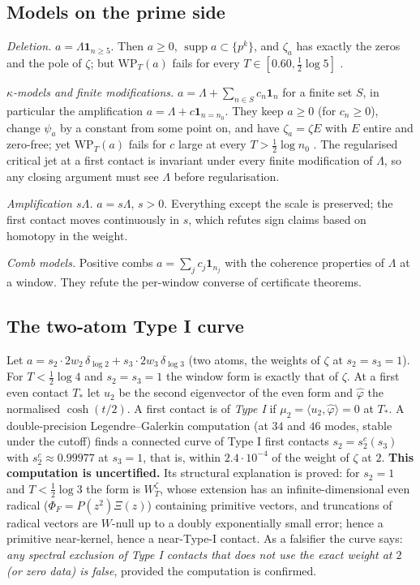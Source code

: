\documentclass[11pt]{amsart}
\theoremstyle{definition}
\theoremstyle{remark}
\newcommand{\supp}{\operatorname{supp}}
\begin{document}
\subsection{Models on the prime side}\label{subsec:primeside}
\emph{Deletion.} $a=\Lambda\mathbf 1_{n\ge5}$. Then $a\ge0$, $\supp a\subset\{p^k\}$, and $\zeta_a$ has exactly the
zeros and the pole of $\zeta$; but $\mathrm{WP}_T(a)$ fails for every $T\in[0.60,\frac12\log5]$
\cite[Thm.~12.5(i)]{Paper47}.

\emph{$\kappa$-models and finite modifications.} $a=\Lambda+\sum_{n\in S}c_n\mathbf 1_{n}$ for a finite set $S$,
in particular the amplification $a=\Lambda+c\mathbf1_{n=n_0}$. They keep $a\ge0$ (for $c_n\ge0$), change
$\psi_a$ by a constant from some point on, and have $\zeta_a=\zeta E$ with $E$ entire and zero-free; yet
$\mathrm{WP}_T(a)$ fails for $c$ large at every $T>\frac12\log n_0$
\cite[Thm.~12.5(ii)]{Paper47}. The regularised critical jet at a first contact is invariant
under every finite modification of $\Lambda$, so any closing argument must see $\Lambda$ before
regularisation.

\emph{Amplification $s\Lambda$.} $a=s\Lambda$, $s>0$. Everything except the scale is preserved; the first
contact moves continuously in $s$, which refutes sign claims based on homotopy in the weight.

\emph{Comb models.} Positive combs $a=\sum_jc_j\mathbf1_{n_j}$ with the coherence properties of $\Lambda$
at a window. They refute the per-window converse of certificate theorems.

\subsection{The two-atom Type I curve}\label{subsec:typeI}
Let $a=s_2\cdot2w_2\,\delta_{\log2}+s_3\cdot2w_3\,\delta_{\log3}$ (two atoms, the weights of $\zeta$ at
$s_2=s_3=1$). For $T<\frac12\log4$ and $s_2=s_3=1$ the window form is exactly that of $\zeta$. At a first
even contact $T_*$ let $u_2$ be the second eigenvector of the even form and $\hat\varphi$ the normalised
$\cosh(t/2)$. A first contact is of \emph{Type I} if $\mu_2=\langle u_2,\hat\varphi\rangle=0$ at $T_*$.
A double-precision Legendre--Galerkin computation (at $34$ and $46$ modes, stable under the cutoff)
finds a connected curve of Type I first contacts $s_2=s_2^c(s_3)$ with $s_2^c\approx0.99977$ at
$s_3=1$, that is, within $2.4\cdot10^{-4}$ of the weight of $\zeta$ at $2$. \textbf{This computation is
uncertified.} Its structural explanation is proved: for $s_2=1$ and $T<\frac12\log3$ the form is
$W^\zeta_T$, whose extension has an infinite-dimensional even radical ($\Phi_F=P(z^2)\Xi(z)$) containing
primitive vectors, and truncations of radical vectors are $W$-null up to a doubly exponentially small
error; hence a primitive near-kernel, hence a near-Type-I contact. As a falsifier the curve says:
\emph{any spectral exclusion of Type I contacts that does not use the exact weight at $2$ (or zero data)
is false}, provided the computation is confirmed.
\end{document}
